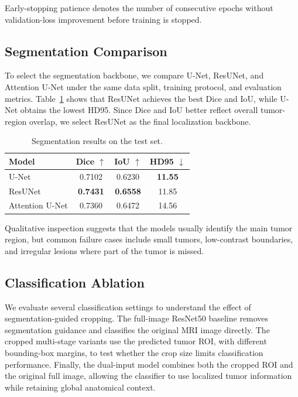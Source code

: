 Early-stopping patience denotes the number of consecutive epochs without validation-loss improvement before training is stopped.




\subsection{Segmentation Comparison}
To select the segmentation backbone, we compare U-Net, ResUNet, and Attention U-Net under the same data split, training protocol, and evaluation metrics. Table~\ref{tab:seg-results} shows that ResUNet achieves the best Dice and IoU, while U-Net obtains the lowest HD95. Since Dice and IoU better reflect overall tumor-region overlap, we select ResUNet as the final localization backbone.

\begin{table}[H]
\centering
\caption{Segmentation results on the test set.}
\label{tab:seg-results}
\begin{tabular}{lccc}
\hline
Model & Dice $\uparrow$ & IoU $\uparrow$ & HD95 $\downarrow$ \\
\hline
U-Net & 0.7102 & 0.6230 & \textbf{11.55} \\
ResUNet & \textbf{0.7431} & \textbf{0.6558} & 11.85 \\
Attention U-Net & 0.7360 & 0.6472 & 14.56 \\
\hline
\end{tabular}
\end{table}

Qualitative inspection suggests that the models usually identify the main tumor region, but common failure cases include small tumors, low-contrast boundaries, and irregular lesions where part of the tumor is missed.




\subsection{Classification Ablation}
We evaluate several classification settings to understand the effect of segmentation-guided cropping. The full-image ResNet50 baseline removes segmentation guidance and classifies the original MRI image directly. The cropped multi-stage variants use the predicted tumor ROI, with different bounding-box margins, to test whether the crop size limits classification performance. Finally, the dual-input model combines both the cropped ROI and the original full image, allowing the classifier to use localized tumor information while retaining global anatomical context.

